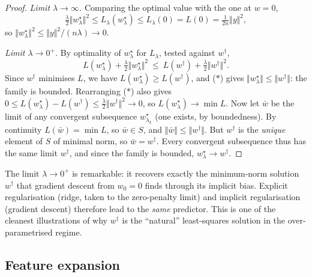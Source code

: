 \begin{proof}
\emph{Limit $\lambda \to \infty$.} Comparing the optimal value with the one at $w =
0$,
\[
\tfrac{\lambda}{2}\Vert w^\star_\lambda \Vert^2 \leq L_\lambda(w^\star_\lambda)
\leq L_\lambda(0) = L(0) = \tfrac{1}{2n}\Vert y \Vert^2 ,
\]
so $\Vert w^\star_\lambda \Vert^2 \leq \Vert y \Vert^2 / (n\lambda) \to 0$.

\emph{Limit $\lambda \to 0^+$.} By optimality of $w^\star_\lambda$ for $L_\lambda$,
tested against $w^\dagger$,
\[
L(w^\star_\lambda) + \tfrac{\lambda}{2}\Vert w^\star_\lambda \Vert^2
\ \leq\ L(w^\dagger) + \tfrac{\lambda}{2}\Vert w^\dagger \Vert^2 .
\tag{$\ast$}
\]
Since $w^\dagger$ minimises $L$, we have $L(w^\star_\lambda) \geq L(w^\dagger)$, and
($\ast$) gives $\Vert w^\star_\lambda \Vert \leq \Vert w^\dagger \Vert$: the family is
bounded. Rearranging ($\ast$) also gives $0 \leq L(w^\star_\lambda) - L(w^\dagger)
\leq \tfrac{\lambda}{2}\Vert w^\dagger \Vert^2 \to 0$, so $L(w^\star_\lambda) \to \min
L$. Now let $\bar w$ be the limit of any convergent subsequence $w^\star_{\lambda_k}$
(one exists, by boundedness). By continuity $L(\bar w) = \min L$, so $\bar w \in S$,
and $\Vert \bar w \Vert \leq \Vert w^\dagger \Vert$. But $w^\dagger$ is the
\emph{unique} element of $S$ of minimal norm, so $\bar w = w^\dagger$. Every
convergent subsequence thus has the same limit $w^\dagger$, and since the family is
bounded, $w^\star_\lambda \to w^\dagger$.
\end{proof}

\begin{remark}
The limit $\lambda \to 0^+$ is remarkable: it recovers exactly the minimum-norm solution $w^\dagger$ that gradient descent from $w_0 = 0$ finds through its implicit
bias. Explicit regularisation (ridge, taken to the zero-penalty limit) and implicit
regularisation (gradient descent) therefore lead to the \emph{same} predictor. This
is one of the cleanest illustrations of why $w^\dagger$ is the ``natural'' least-squares
solution in the over-parametrised regime.
\end{remark}

\subsection{Feature expansion}
\label{subsec:features}

